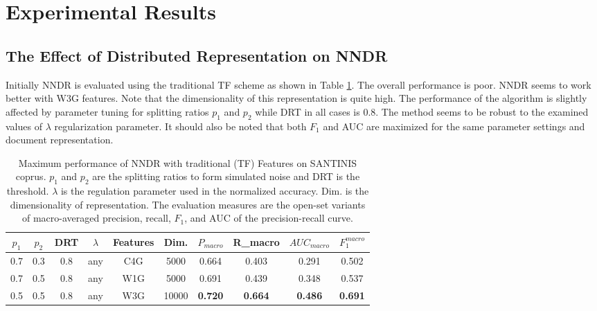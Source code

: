 \section{Experimental Results}\label{chap:word_embeddings:sec:results}

\subsection{The Effect of Distributed Representation on NNDR}\label{chap:word_embeddings:sec:NNDR_PVBOW_vs_BOW}

Initially NNDR is evaluated using the traditional TF scheme as shown in Table \ref{chap:word_embeddings:tbl:NNDR_TF}. The overall performance is poor. NNDR seems to work better with W3G features. Note that the dimensionality of this representation is quite high. The performance of the algorithm is slightly affected by parameter tuning for splitting ratios $p_1$ and $p_2$ while DRT in all cases is $0.8$. The method seems to be robust to the examined values of $\lambda$ regularization parameter. It should also be noted that both $F_1$ and AUC are maximized for the same parameter settings and document representation.

\begin{table}[t]
\center
\begin{tabular}{cccccccccc}
\hline
$p_1$ & $p_2$ & DRT & $\lambda$ & Features & Dim. & $P_{macro}$ & R_{macro} & $AUC_{macro}$ & $F_1^{macro}$ \\
\hline
0.7 & 0.3 & 0.8 & any & C4G & 5000 & 0.664 & 0.403 & 0.291 & 0.502 \\
0.7 & 0.5 & 0.8 & any & W1G & 5000 & 0.691 & 0.439 & 0.348 & 0.537 \\
0.5 & 0.5 & 0.8 & any & W3G & 10000 & \textbf{0.720} & \textbf{0.664} & \textbf{0.486} & \textbf{0.691} \\
\hline
\end{tabular}
\caption {Maximum performance of NNDR with traditional (TF) Features on SANTINIS coprus. $p_1$ and $p_2$ are the splitting ratios to form simulated noise and DRT is the threshold. $\lambda$ is the regulation parameter used in the normalized accuracy. Dim. is the dimensionality of representation. The evaluation measures are the open-set variants of macro-averaged precision, recall, $F_1$, and AUC of the precision-recall curve.}
\label{chap:word_embeddings:tbl:NNDR_TF}
\end{table}

